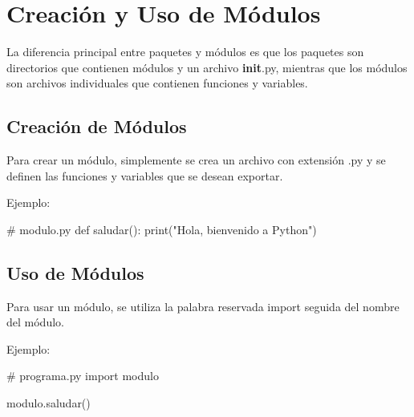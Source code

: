\documentclass[
  a4paper,
  DIV=11,
  numbers=noendperiod,
  onepage,
  openany]{scrreprt}
\newenvironment{Shaded}{\begin{snugshade}}{\end{snugshade}}
\newcommand{\BuiltInTok}[1]{\textcolor[rgb]{0.00,0.23,0.31}{#1}}
\newcommand{\CommentTok}[1]{\textcolor[rgb]{0.37,0.37,0.37}{#1}}
\newcommand{\ImportTok}[1]{\textcolor[rgb]{0.00,0.46,0.62}{#1}}
\newcommand{\KeywordTok}[1]{\textcolor[rgb]{0.00,0.23,0.31}{#1}}
\newcommand{\NormalTok}[1]{\textcolor[rgb]{0.00,0.23,0.31}{#1}}
\newcommand{\StringTok}[1]{\textcolor[rgb]{0.13,0.47,0.30}{#1}}
\begin{document}
\chapter{Creación y Uso de
Módulos}\label{creaciuxf3n-y-uso-de-muxf3dulos}

\begin{tcolorbox}[enhanced jigsaw, title=\textcolor{quarto-callout-tip-color}{\faLightbulb}\hspace{0.5em}{Tip}, colback=white, rightrule=.15mm, opacityback=0, colframe=quarto-callout-tip-color-frame, titlerule=0mm, opacitybacktitle=0.6, breakable, coltitle=black, colbacktitle=quarto-callout-tip-color!10!white, bottomtitle=1mm, toptitle=1mm, left=2mm, arc=.35mm, toprule=.15mm, leftrule=.75mm, bottomrule=.15mm]

La diferencia principal entre paquetes y módulos es que los paquetes son
directorios que contienen módulos y un archivo \textbf{init}.py,
mientras que los módulos son archivos individuales que contienen
funciones y variables.

\end{tcolorbox}

\section{Creación de Módulos}\label{creaciuxf3n-de-muxf3dulos}

Para crear un módulo, simplemente se crea un archivo con extensión .py y
se definen las funciones y variables que se desean exportar.

Ejemplo:

\begin{Shaded}
\begin{Highlighting}[]
\CommentTok{\# modulo.py}
\KeywordTok{def}\NormalTok{ saludar():}
    \BuiltInTok{print}\NormalTok{(}\StringTok{"Hola, bienvenido a Python"}\NormalTok{)}
\end{Highlighting}
\end{Shaded}

\section{Uso de Módulos}\label{uso-de-muxf3dulos}

Para usar un módulo, se utiliza la palabra reservada import seguida del
nombre del módulo.

Ejemplo:

\begin{Shaded}
\begin{Highlighting}[]
\CommentTok{\# programa.py}
\ImportTok{import}\NormalTok{ modulo}

\NormalTok{modulo.saludar()}
\end{Highlighting}
\end{Shaded}
\end{document}
